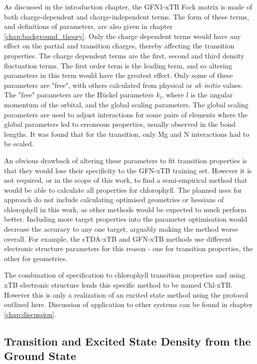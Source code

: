 As discussed in the introduction chapter, the GFN1-xTB Fock matrix is made of both
charge-dependent and charge-independent terms. The form of these terms, and definitions
of parameters, are also given in chapter \ref{chap:background_theory}. Only the
charge dependent terms would have any effect on the partial and transition charges,
thereby affecting the transition properties. The charge dependent terms are the 
first, second and third density fluctuation terms. The first order term is the leading 
term, and so altering parameters in this term would have the greatest effect. Only
some of these parameters are "free", with others calculated from physical or \emph{ab initio}
values. The "free" parameters are the H{\"u}ckel parameters $k_l$, where $l$ is
the angular momentum of the orbital, and the global scaling parameters. The global
scaling parameters are used to adjust interactions for some pairs of elements where
the global parameters led to erroneous properties, usually observed in the bond
lengths. It was found that for the \Qy transition, only Mg and N interactions had
to be scaled.

An obvious drawback of altering these parameters to fit transition properties is
that they would lose their specificity to the GFN-xTB training set. However it is
not required, or in the scope of this work, to find a semi-empirical method that 
would be able to calculate all properties for chlorophyll. The planned uses for
approach do not include calculating optimised geometries or hessians of chlorophyll
in this work, as other methods would be expected to much perform better. Including
more target properties into the parameter optimisation would decrease the accuracy
to any one target, arguably making the method worse overall. For example, the sTDA-xTB 
and GFN-xTB methods use different electronic structure parameters for this reason - 
one for transition properties, the other for geometries.

The combination of specification to chlorophyll transition properties and using 
xTB electronic structure lends this specific method to be named Chl-xTB. However
this is only a realization of an excited state method using the protocol outlined
here. Discussion of application to other systems can be found in chapter \ref{chap:discussion}.

\subsection{Transition and Excited State Density from the Ground State}
\label{subsec:trans_excited_densities}

